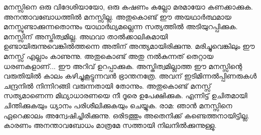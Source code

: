 മനസ്സിനെ ഒരു വിദേശിയായോ, ഒരു കഷണം കല്ലോ മരമായോ കണക്കാക്കുക. അനന്താവബോധത്തിൽ മനസ്സില്ല. അതുകൊണ്ട് ഈ അയഥാർത്ഥമായ മനസ്സുണ്ടാക്കുന്നതൊന്നും യാഥാർഥ്യമല്ലെന്ന സത്യത്തിൽ അടിയുറപ്പിക്കുക. മനസ്സിന്‌ അസ്തിത്വമില്ല. അഥവാ താല്‍ക്കാലികമായി ഉണ്ടായിരുന്നുവെങ്കിൽത്തന്നെ അതിന്‌ അന്ത്യമായിരിക്കുന്നു. മരിച്ചുവെങ്കിലും ഈ മനസ്സ് എല്ലാം കാണുന്നു.  അതുകൊണ്ട് അതു നൽകുന്നത് തെറ്റായ ധരണകളാണ്‌...  ഈ അറിവ് ഉറപ്പാക്കുക. അസ്തിത്വമില്ലാത്ത ഈ മനസ്സിന്റെ വരുതിയിൽ കാലം കഴിച്ചുകൂട്ടുന്നവൻ ഭ്രാന്തനത്രേ. അവന്‌ ഇടിമിന്നൽപ്പിണരുകള്‍  ചന്ദ്രനിൽ നിന്നിറങ്ങി വരുന്നതായി തോന്നും. അതുകൊണ്ട്  മനസ്സ് സത്യമാണെന്ന മിഥ്യാധാരണയെ നീ  ദൂരെ ഉപേക്ഷിക്കുക. എന്നിട്ട് ഉചിതമായി ചിന്തിക്കുകയും ധ്യാനം പരിശീലിക്കുകയും ചെയ്യുക. രാമ: ഞാൻ മനസ്സിനെ ഏറെക്കാലം അന്വേഷിച്ചിരിക്കുന്നു. ഒരിടത്തും അതെനിക്ക് കണ്ടെത്തനായിട്ടില്ല. കാരണം അനന്താവബോധം മാത്രമേ സത്തായി നിലനിൽക്കുന്നുള്ളു. 

